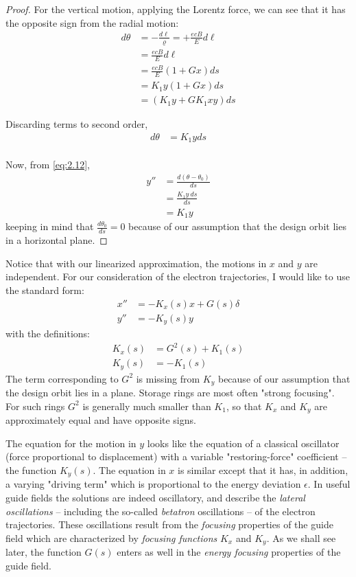 \begin{proof}
	For the vertical motion, applying the Lorentz force, we can see that it has the opposite sign from the radial motion:
	\begin{align*}
		d\theta &= -\frac{d\ell}{\varrho} = + \frac{ecB}{E}d\ell\\
				&= \frac{ecB}{E}d\ell\\
				&= \frac{ecB}{E}(1+Gx)ds\\
				&= K_1 y (1+Gx)ds\\
				& = (K_1 y + GK_1xy)ds
	\end{align*}

	Discarding terms to second order,
	\begin{align*}
		d\theta &= K_1 y ds\\
	\end{align*}

	Now, from \eqref{eq:2.12},
	\begin{align*}
		y'' &= \frac{d(\theta-\theta_0)}{ds}\\
			&= \frac{K_1 y\ ds}{ds}\\
			&= K_1 y
	\end{align*}
	keeping in mind that $\frac{d\theta_0}{ds} = 0$ because of our assumption that the design orbit lies in a horizontal plane.
\end{proof}

Notice that with our linearized approximation, the motions in $x$ and $y$ are independent. For our consideration of the electron trajectories, I would like to use the standard form:
\begin{align}
	x'' &= -K_x(s)x + G(s)\delta\label{eq:2.19}\\
	y'' &= -K_y(s)y\label{eq:2.20}
\end{align}
with the definitions:
\begin{align}
	K_x(s) &= G^2(s)+K_1(s) \label{eq:2.21}\\
	K_y(s) &= -K_1(s) \label{eq:2.22}
\end{align}
The term corresponding to $G^2$ is missing from $K_y$ because of our assumption that
the design orbit lies in a plane. Storage rings are most often "strong focusing". For such rings $G^2$ is generally much smaller than $K_1$, so that $K_x$ and $K_y$ are approximately equal and have opposite signs.

The equation for the motion in $y$ looks like the equation of a classical oscillator (force proportional to displacement) with a variable "restoring-force" coefficient -- the function $K_y(s)$. The equation in $x$ is similar except that it has, in addition, a varying "driving term" which is proportional to the energy deviation $\epsilon$. In useful guide fields the solutions are indeed oscillatory, and describe the \textit{lateral oscillations} -- including the so-called \textit{betatron} oscillations -- of the electron trajectories. These oscillations result from the \textit{focusing} properties of the guide field which are characterized by \textit{focusing functions} $K_x$ and $K_y$. As we shall see later, the function $G(s)$ enters as well in the \textit{energy focusing} properties of the guide field.

